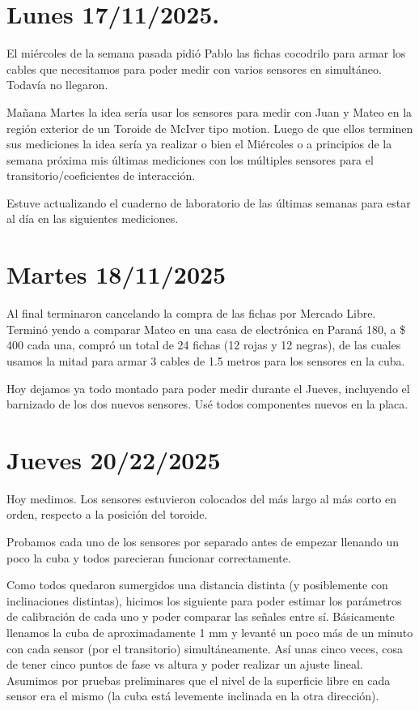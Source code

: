 
\section{Lunes 17/11/2025.} 
El miércoles de la semana pasada pidió Pablo las fichas cocodrilo para armar los cables que necesitamos para poder medir con varios sensores en simultáneo. Todavía no llegaron. 

Mañana Martes la idea sería usar los sensores para medir con  Juan y Mateo en la región exterior de un Toroide de McIver tipo motion. Luego de que ellos terminen sus mediciones la idea sería ya realizar o bien el Miércoles o a principios de la semana próxima mis últimas mediciones con los múltiples sensores para el transitorio/coeficientes de interacción.  

Estuve actualizando el cuaderno de laboratorio de las últimas semanas para estar al día en las siguientes mediciones. 

\section{Martes 18/11/2025} 
Al final terminaron cancelando la compra de las fichas por Mercado Libre. Terminó yendo a comparar Mateo en una casa de electrónica en Paraná 180, a \$ 400 cada una, compró un total de 24 fichas (12 rojas y 12 negras), de las cuales usamos la mitad para armar 3 cables de 1.5 metros para los sensores en la cuba. 

Hoy dejamos ya todo montado para poder medir durante el Jueves, incluyendo el barnizado de los dos nuevos sensores. Usé todos componentes nuevos en la placa.  




\section{Jueves 20/22/2025} 
Hoy medimos. Los sensores estuvieron colocados del más largo al más corto en orden, respecto a la posición del toroide.  

Probamos cada uno de los sensores por separado antes de empezar llenando un poco la cuba y todos parecieran funcionar correctamente. 

Como todos quedaron sumergidos una distancia distinta (y posiblemente con inclinaciones distintas), hicimos los siguiente para poder estimar los parámetros de calibración de cada uno y poder comparar las señales entre sí. Básicamente llenamos la cuba de aproximadamente 1 mm y levanté un poco más de un minuto con cada sensor (por el transitorio) simultáneamente. Así unas cinco veces, cosa de tener cinco puntos de fase vs altura y poder realizar un ajuste lineal. Asumimos por pruebas preliminares que el nivel de la superficie libre en cada sensor era el mismo (la cuba está levemente inclinada en la otra dirección). 





